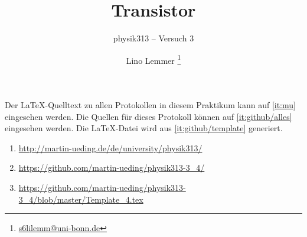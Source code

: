 


\usepackage{placeins}



\subject{Praktikumsprotokoll}
\title{Transistor}
\subtitle{physik313 – Versuch 3}
\author{
	Lino Lemmer \footnote{\href{mailto:s6lilemm@uni-bonn.de}{s6lilemm@uni-bonn.de}}
}


\newcommand\IB{I_\text{B}}
\newcommand\IC{I_\text{C}}
\newcommand\ID{I_\text{D}}
\newcommand\IE{I_\text{E}}
\newcommand\IS{I_\text{S}}
\newcommand\RC{R_\text{C}}
\newcommand\RE{R_\text{E}}
\newcommand\UBE{U_\text{BE}}
\newcommand\UB{U_\text{B}}
\newcommand\UC{U_\text{C}}
\newcommand\UCE{U_\text{CE}}
\newcommand\UE{U_\text{E}}
\newcommand\UGS{U_\text{GS}}
\newcommand\UDS{U_\text{DS}}

\usepackage{tocloft}


\newcommand{\FIXME}[1]{\printTODO{FIXME: #1}}
\newcommand{\TODO}[1]{\printTODO{TODO: #1}}
\newcommand{\XXX}[1]{\printTODO{XXX: #1}}
\newcommand{\FRAGE}[1]{\printTODO{Rückfrage: #1}}

\newcommand{\printTODO}[1]{
	\par%
	\textcolor{OrangeRed}{\textsf{#1}}%
	\par%
	\refstepcounter{todo}
	\addcontentsline{lotd}{todo}{#1}
}




\maketitle

Der \LaTeX-Quelltext zu allen Protokollen in diesem Praktikum kann auf
\ref{it:mu} eingesehen werden. Die Quellen für dieses Protokoll können auf
\ref{it:github/alles} eingesehen werden. Die \LaTeX-Datei wird aus
\ref{it:github/template} generiert.

\begin{enumerate}
	\item
		\label{it:mu}
		\url{http://martin-ueding.de/de/university/physik313/}
	\item
		\label{it:github/alles}
		\url{https://github.com/martin-ueding/physik313-3_4/}
	\item
		\label{it:github/template}
		\url{https://github.com/martin-ueding/physik313-3_4/blob/master/Template_4.tex}
\end{enumerate}


